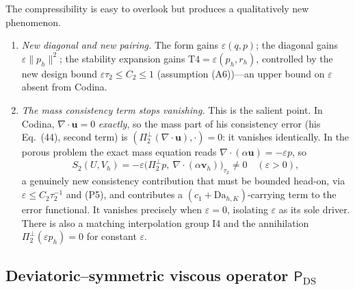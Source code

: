 \documentclass[11pt]{article}
\theoremstyle{remark}
\newcommand{\bu}{\boldsymbol{u}}
\newcommand{\bv}{\boldsymbol{v}}
\newcommand{\ViscProj}{\mathsf{P}_{\mathrm{DS}}}
\newcommand{\norm}[1]{\lVert #1 \rVert}
\newcommand{\Dah}{\mathrm{Da}_{h,K}}
\newcommand{\Ptwoo}{\Pi_{2}^{\perp}}
\begin{document}
The compressibility is easy to overlook but produces a qualitatively new phenomenon.
\begin{enumerate}[leftmargin=1.5em,itemsep=0.3ex]
\item \emph{New diagonal and new pairing.} The form gains $\varepsilon(q,p)$; the diagonal
gains $\varepsilon\norm{p_h}^2$; the stability expansion gains
$\mathrm{T4}=\varepsilon(p_h,r_h)$, controlled by the new design bound $\varepsilon\tau_2\le
C_2\le1$ (assumption (A6))---an upper bound on $\varepsilon$ absent from Codina.
\item \emph{The mass consistency term stops vanishing.} This is the salient point. In
Codina, $\nabla\cdot\bu=0$ \emph{exactly}, so the mass part of his consistency error (his
Eq.~(44), second term) is $(\Ptwoo(\nabla\cdot\bu),\cdot)=0$: it vanishes identically. In
the porous problem the exact mass equation reads $\nabla\cdot(\alpha\bu)=-\varepsilon p$, so
\[
  S_2(U,V_h)=-\varepsilon\bigl(\Ptwoo p,\ \nabla\cdot(\alpha\bv_h)\bigr)_{\tau_2}\neq0
  \quad(\varepsilon>0),
\]
a genuinely new consistency contribution that must be bounded head-on, via
$\varepsilon\le C_2\tau_2^{-1}$ and (P5), and contributes a $(c_1+\Dah)$-carrying term to the
error functional. It vanishes precisely when $\varepsilon=0$, isolating $\varepsilon$ as its
sole driver. There is also a matching interpolation group I4 and the annihilation
$\Ptwoo(\varepsilon p_h)=0$ for constant $\varepsilon$.
\end{enumerate}

\subsection{Deviatoric--symmetric viscous operator \texorpdfstring{$\ViscProj$}{Pi-DS}}
\label{sec:visc}
\end{document}
